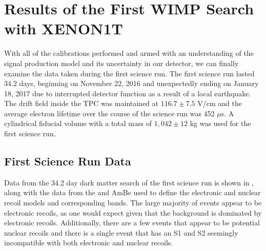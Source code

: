 \section{Results of the First WIMP Search with XENON1T}

With all of the calibrations performed and armed with an understanding of the signal production model and its uncertainty in our detector, we can finally examine the data taken during the first science run.  The first science run lasted 34.2 days, beginning on November 22, 2016 and unexpectedly ending on January 18, 2017 due to interrupted detector function as a result of a local earthquake.  The drift field inside the TPC was maintained at $116.7 \pm 7.5$ V/cm and the average electron lifetime over the course of the science run was 452 $\mu$s.  A cylindrical fiducial volume with a total mass of $1,042 \pm 12$ kg was used for the first science run.


\subsection{First Science Run Data}

Data from the 34.2 day dark matter search of the first science run is shown in , along with the data from the  and AmBe used to define the electronic and nuclear recoil models and corresponding bands.  The large majority of events appear to be electronic recoils, as one would expect given that the background is dominated by electronic recoils.  Additionally, there are a few events that appear to be potential nuclear recoils and there is a single event that has an S1 and S2 seemingly incompatible with both electronic and nuclear recoils.  

